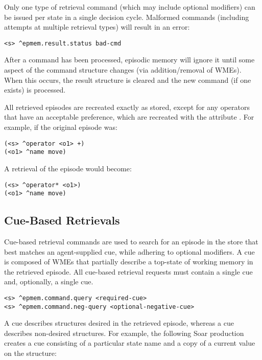 Only one type of retrieval command (which may include optional modifiers) can be issued per state in a single decision cycle.  
Malformed commands (including attempts at multiple retrieval types) will result in an error:

\begin{verbatim}
<s> ^epmem.result.status bad-cmd
\end{verbatim}

After a command has been processed, episodic memory will ignore it until some aspect of the command structure changes (via addition/removal of WMEs).  
When this occurs, the result structure is cleared and the new command (if one exists) is processed.

All retrieved episodes are recreated exactly as stored, except for any operators that have an acceptable preference, which are recreated with the attribute .
For example, if the original episode was:

\begin{verbatim}
(<s> ^operator <o1> +)
(<o1> ^name move)
\end{verbatim}

A retrieval of the episode would become:

\begin{verbatim}
(<s> ^operator* <o1>)
(<o1> ^name move)
\end{verbatim}

\subsection{Cue-Based Retrievals}
Cue-based retrieval commands are used to search for an episode in the store that best matches an agent-supplied cue, while adhering to optional modifiers.  
A cue is composed of WMEs that partially describe a top-state of working memory in the retrieved episode.  
All cue-based retrieval requests must contain a single  cue and, optionally, a single  cue.  

\begin{verbatim}
<s> ^epmem.command.query <required-cue>
<s> ^epmem.command.neg-query <optional-negative-cue>
\end{verbatim}

A  cue describes structures desired in the retrieved episode, whereas a  cue describes non-desired structures.  
For example, the following Soar production creates a  cue consisting of a particular state name and a copy of a current value on the  structure:

